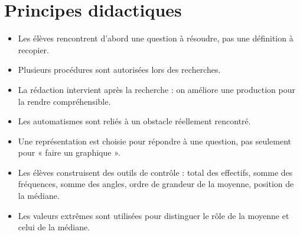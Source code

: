 \documentclass[12pt,a4paper]{article}
\begin{document}
\section*{Principes didactiques}

\begin{itemize}
  \item Les élèves rencontrent d'abord une question à résoudre,
        pas une définition à recopier.
  \item Plusieurs procédures sont autorisées lors des recherches.
  \item La rédaction intervient après la recherche :
        on améliore une production pour la rendre compréhensible.
  \item Les automatismes sont reliés à un obstacle réellement rencontré.
  \item Une représentation est choisie pour répondre à une question,
        pas seulement pour « faire un graphique ».
  \item Les élèves construisent des outils de contrôle :
        total des effectifs, somme des fréquences, somme des angles,
        ordre de grandeur de la moyenne, position de la médiane.
  \item Les valeurs extrêmes sont utilisées pour distinguer
        le rôle de la moyenne et celui de la médiane.
\end{itemize}
\end{document}
